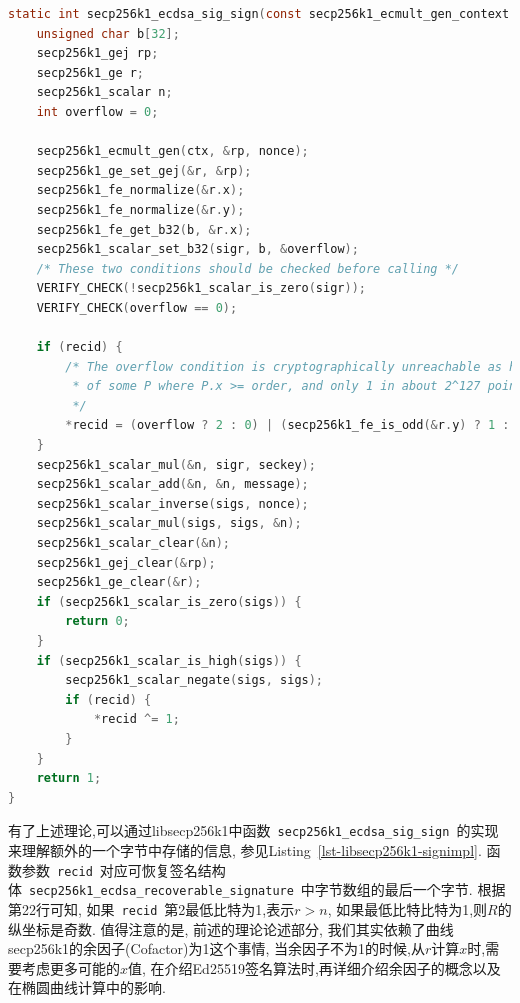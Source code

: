 \documentclass{article}
\newcommand{\code}[1]{\lstinline!#1!}
\begin{document}
\begin{lstlisting}[language=c, caption = libsecp256k1中的\textsf{secp256k1_ecdsa_sig_sign}, label=lst-libsecp256k1-signimpl]
static int secp256k1_ecdsa_sig_sign(const secp256k1_ecmult_gen_context *ctx, secp256k1_scalar *sigr, secp256k1_scalar *sigs, const secp256k1_scalar *seckey, const secp256k1_scalar *message, const secp256k1_scalar *nonce, int *recid) {
    unsigned char b[32];
    secp256k1_gej rp;
    secp256k1_ge r;
    secp256k1_scalar n;
    int overflow = 0;

    secp256k1_ecmult_gen(ctx, &rp, nonce);
    secp256k1_ge_set_gej(&r, &rp);
    secp256k1_fe_normalize(&r.x);
    secp256k1_fe_normalize(&r.y);
    secp256k1_fe_get_b32(b, &r.x);
    secp256k1_scalar_set_b32(sigr, b, &overflow);
    /* These two conditions should be checked before calling */
    VERIFY_CHECK(!secp256k1_scalar_is_zero(sigr));
    VERIFY_CHECK(overflow == 0);

    if (recid) {
        /* The overflow condition is cryptographically unreachable as hitting it requires finding the discrete log
         * of some P where P.x >= order, and only 1 in about 2^127 points meet this criteria.
         */
        *recid = (overflow ? 2 : 0) | (secp256k1_fe_is_odd(&r.y) ? 1 : 0);
    }
    secp256k1_scalar_mul(&n, sigr, seckey);
    secp256k1_scalar_add(&n, &n, message);
    secp256k1_scalar_inverse(sigs, nonce);
    secp256k1_scalar_mul(sigs, sigs, &n);
    secp256k1_scalar_clear(&n);
    secp256k1_gej_clear(&rp);
    secp256k1_ge_clear(&r);
    if (secp256k1_scalar_is_zero(sigs)) {
        return 0;
    }
    if (secp256k1_scalar_is_high(sigs)) {
        secp256k1_scalar_negate(sigs, sigs);
        if (recid) {
            *recid ^= 1;
        }
    }
    return 1;
}
\end{lstlisting}


有了上述理论,可以通过libsecp256k1中函数~\code{secp256k1_ecdsa_sig_sign}~的实现来理解额外的一个字节中存储的信息,
参见Listing~\ref{lst-libsecp256k1-signimpl}.
函数参数~\code{recid}~对应可恢复签名结构体~\code{secp256k1_ecdsa_recoverable_signature}~中字节数组的最后一个字节.
根据第22行可知, 如果~\code{recid}~第2最低比特为1,表示$r > n$, 如果最低比特比特为1,则$R$的纵坐标是奇数.
值得注意的是, 前述的理论论述部分, 我们其实依赖了曲线secp256k1的余因子(Cofactor)为1这个事情,
当余因子不为1的时候,从$r$计算$x$时,需要考虑更多可能的$x$值, 
在介绍Ed25519签名算法时,再详细介绍余因子的概念以及在椭圆曲线计算中的影响.
\end{document}

